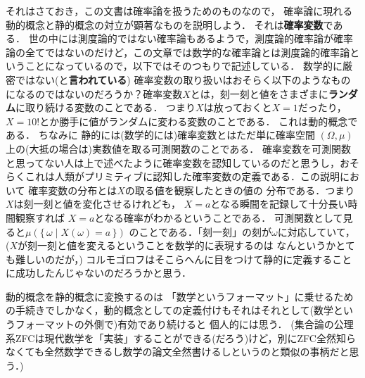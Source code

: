 \documentclass[leqno, 12pt]{jsarticle}
\begin{document}
それはさておき，この文書は確率論を扱うためのものなので，
確率論に現れる動的概念と静的概念の対立が顕著なものを説明しよう．
それは\textbf{確率変数}である．
世の中には測度論的ではない確率論もあるようで，測度論的確率論が確率論の全てではないのだけど，この文章では数学的な確率論とは測度論的確率論ということになっているので，以下ではそのつもりで記述している．
数学的に厳密ではない(と\textbf{言われている})
確率変数の取り扱いはおそらく以下のようなものになるのではないのだろうか？確率変数$X$とは，刻一刻と値をさまざまに\textbf{ランダム}に取り続ける変数のことである．
つまり$X$は放っておくと$X=1$だったり，
$X=10!$とか勝手に値がランダムに変わる変数のことである．
これは動的概念である．
ちなみに
静的には(数学的には)確率変数とはただ単に確率空間
$(\Omega, \mu)$上の(大抵の場合は)実数値を取る可測関数のことである．
確率変数を可測関数と思ってない人は上で述べたように確率変数を認知しているのだと思うし，おそらくこれは人類がプリミティブに認知した確率変数の定義である．この説明において
確率変数の分布とは$X$の取る値を観察したときの値の
分布である．つまり$X$は刻一刻と値を変化させるけれども，
$X=a$となる瞬間を記録して十分長い時間観察すれば
$X=a$となる確率がわかるということである．
可測関数として見ると$\mu(\{\, \omega\mid X(\omega)=a\, \})$
のことである．「刻一刻」の刻が$\omega$に対応していて，
($X$が刻一刻と値を変えるということを数学的に表現するのは
なんというかとても難しいのだが，)
コルモゴロフはそこらへんに目をつけて静的に定義することに成功したんじゃないのだろうかと思う．

動的概念を静的概念に変換するのは
「数学というフォーマット」に乗せるための手続きでしかなく，動的概念としての定義付けもそれはそれとして(数学というフォーマットの外側で)有効であり続けると
個人的には思う．
(集合論の公理系ZFCは現代数学を「実装」することができる(だろう)けど，別にZFC全然知らなくても全然数学できるし数学の論文全然書けるしというのと類似の事柄だと思う．)
\end{document}
